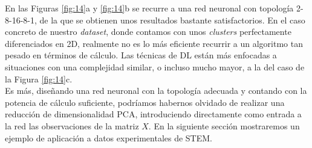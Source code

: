 En las Figuras \ref{fig:14}a y \ref{fig:14}b se recurre a una red neuronal con topología 2-8-16-8-1, de la que se obtienen unos resultados bastante satisfactorios. En el caso concreto de nuestro \textit{dataset}, donde contamos con unos \textit{clusters} perfectamente diferenciados en 2D, realmente no es lo más eficiente recurrir a un algoritmo tan pesado en términos de cálculo. Las técnicas de DL están más enfocadas a situaciones con una complejidad similar, o incluso mucho mayor, a la del caso de la Figura \ref{fig:14}c.\\

Es más, diseñando una red neuronal con la topología adecuada y contando con la potencia de cálculo suficiente, podríamos habernos olvidado de realizar una reducción de dimensionalidad PCA, introduciendo directamente como entrada a la red las observaciones de la matriz $X$. En la siguiente sección mostraremos un ejemplo de aplicación a datos experimentales de STEM.
